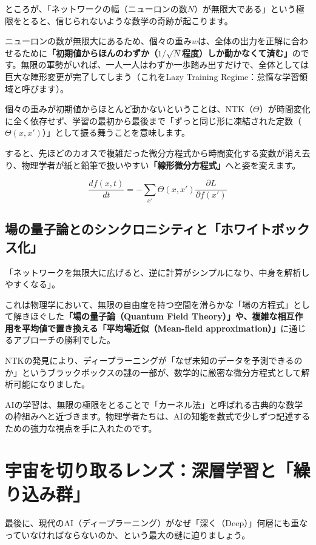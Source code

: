 ところが、「ネットワークの幅（ニューロンの数\(N\)）が無限大である」という極限をとると、信じられないような数学の奇跡が起こります。

ニューロンの数が無限大にあるため、個々の重み\(w\)は、全体の出力を正解に合わせるために\textbf{「初期値からほんのわずか（\(1/\sqrt{N}\)程度）しか動かなくて済む」}のです。無限の軍勢がいれば、一人一人はわずか一歩踏み出すだけで、全体としては巨大な陣形変更が完了してしまう（これをLazy Training Regime：怠惰な学習領域と呼びます）。

個々の重みが初期値からほとんど動かないということは、NTK（\(\Theta\)）が時間変化に全く依存せず、学習の最初から最後まで「ずっと同じ形に凍結された定数（\(\Theta(x, x')\)）」として振る舞うことを意味します。

すると、先ほどのカオスで複雑だった微分方程式から時間変化する変数が消え去り、物理学者が紙と鉛筆で扱いやすい\textbf{「線形微分方程式」}へと姿を変えます。

\[\frac{df(x, t)}{dt} = - \sum_{x'} \Theta(x, x') \frac{\partial L}{\partial f(x')}\]

\subsection{場の量子論とのシンクロニシティと「ホワイトボックス化」}

「ネットワークを無限大に広げると、逆に計算がシンプルになり、中身を解析しやすくなる」。

これは物理学において、無限の自由度を持つ空間を滑らかな「場の方程式」として解きほぐした\textbf{「場の量子論（Quantum Field Theory）」や、複雑な相互作用を平均値で置き換える「平均場近似（Mean-field approximation）」}に通じるアプローチの勝利でした。

NTKの発見により、ディープラーニングが「なぜ未知のデータを予測できるのか」というブラックボックスの謎の一部が、数学的に厳密な微分方程式として解析可能になりました。

AIの学習は、無限の極限をとることで「カーネル法」と呼ばれる古典的な数学の枠組みへと近づきます。物理学者たちは、AIの知能を数式で少しずつ記述するための強力な視点を手に入れたのです。

\section{宇宙を切り取るレンズ：深層学習と「繰り込み群」}

最後に、現代のAI（ディープラーニング）がなぜ「深く（Deep）」何層にも重なっていなければならないのか、という最大の謎に迫りましょう。


